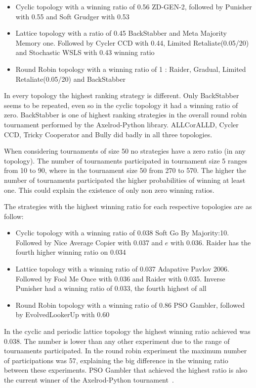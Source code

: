 \begin{itemize}
	\item Cyclic topology with a winning ratio of 0.56 ZD-GEN-2, followed by Punisher
	      with 0.55 and Soft Grudger with 0.53
	\item Lattice topology with a ratio of 0.45 BackStabber and Meta Majority
	      Memory one. Followed by Cycler CCD with 0.44, Limited Retaliate(0.05/20)
	      and Stochastic WSLS with 0.43 winning ratio
	\item Round Robin topology with a winning ratio of 1 : Raider, Gradual, Limited
	      Retaliate(0.05/20) and BackStabber
\end{itemize}

In every topology the highest ranking strategy is different.
Only BackStabber seems to be repeated, even so in the cyclic
topology it had a winning ratio of zero. BackStabber is one of highest ranking
strategies in the overall round robin tournament performed by the Axelrod-Python
library. ALLCorALLD, Cycler CCD, Tricky Cooperator and Bully did badly in all
three topologies.

When considering tournaments of size 50 no strategies have a zero ratio
(in any topology). The number of tournaments participated in tournament size 5
ranges from 10 to 90, where in the tournament size 50 from 270 to 570. The higher
the number of tournaments participated the higher probabilities of winning at
least one. This could explain the existence of only non zero winning ratios.

The strategies with the highest winning ratio for each respective topologies are
as follow:

\begin{itemize}
	\item Cyclic topology with a winning ratio of 0.038 Soft Go By Majority:10.
	      Followed by Nice Average Copier with 0.037 and \(e\) with 0.036. Raider
	      has the fourth higher winning ratio on 0.034
	\item Lattice topology with a winning ratio of 0.037 Adapative Pavlov 2006.
	      Followed by Fool Me Once with 0.036 and Raider with 0.035. Inverse
	      Punisher had a winning ratio of 0.033, the fourth highest of all
	\item Round Robin topology with a winning ratio of 0.86 PSO Gambler, followed
	      by EvolvedLookerUp with 0.60
\end{itemize}

In the cyclic and periodic lattice topology the highest winning ratio achieved
was 0.038. The number is lower than any other experiment due to the range of
tournaments participated. In the round robin experiment the maximum number of
participations was 57, explaining the big difference in the winning ratio between
these experiments. PSO Gambler that achieved the highest ratio is also the current
winner of the Axelrod-Python tournament~\cite{pso_gambler}.

